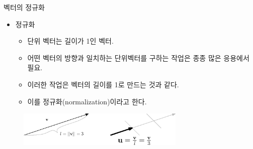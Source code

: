 \documentclass{beamer}
\begin{document}
\begin{frame}{벡터의 정규화}
\begin{itemize}
	\item 정규화
	\begin{itemize}
	\item 단위 벡터는 길이가 1인 벡터.
	\item 어떤 벡터의 방향과 일치하는 단위벡터를 구하는 작업은 종종 많은 응용에서 필요.
	\item 이러한 작업은 벡터의 길이를 1로 만드는 것과 같다.
	\item 이를 정규화(normalization)이라고 한다.
	\end{itemize}
\end{itemize}

\begin{figure}
\includegraphics[width=8cm]{Math_vector/unitVector.eps}
\end{figure}
\end{frame}
\end{document}

